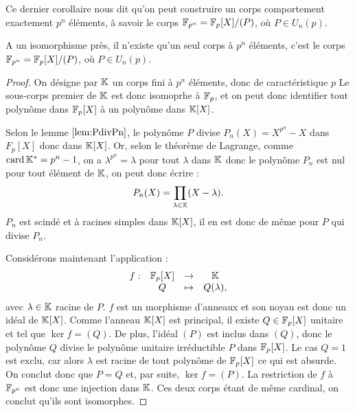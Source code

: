 \begin{rmq}
Ce dernier corollaire nous dit qu'on peut construire un corps comportement exactement $p^n$ éléments,
à savoir le corps $\mathbb{F}_{p^n} = \mathbb{F}_p[X] / (P)$, où $P \in U_n(p)$.
\end{rmq}

\begin{thm}
A un isomorphisme près, il n'existe qu'un seul corps à $p^n$ éléments, c'est le corps $\mathbb{F}_{p^n} = \mathbb{F}_p[X] / (P)$,
où $P \in U_n(p)$.
\end{thm}

\begin{proof}
On désigne par $\mathbb{K}$ un corps fini à $p^n$ éléments, donc de caractéristique $p$
Le sous-corps premier de $\mathbb{K}$ est donc isomoprhe à $\mathbb{F}_p$,
et on peut donc identifier tout polynôme dans $\mathbb{F}_p[X]$ à un polynôme dans $\mathbb{K}[X]$. \newline

Selon le lemme $\ref{lem:PdivPn}$, le polynôme $P$ divise $P_n(X) = X^{p^n} - X$ dans $F_p[X]$ donc dans $\mathbb{K}[X]$. 
Or, selon le théorème de Lagrange, comme $\operatorname{card}{\mathbb{K^{\ast}}} = p^n-1$, on a $\lambda^{p^n} = \lambda$ 
pour tout $\lambda$ dans $\mathbb{K}$ donc  le polynôme $P_n$ est nul pour tout élément de $\mathbb{K}$, on peut donc écrire :
\[ P_n(X) = \prod_{\lambda \in \mathbb{K}} (X - \lambda) . \]
$P_n$ est scindé et à racines simples dans $\mathbb{K}[X]$, il en est donc de même pour $P$ qui divise $P_n$. \newline

Considérons maintenant l'application :
\[ \begin{array}{c c c c}
f : & \mathbb{F}_p[X] & \to & \mathbb{K} \\
& Q & \mapsto & Q(\lambda) , 
\end{array} \]
avec $\lambda \in \mathbb{K}$ racine de $P$. $f$ est un morphisme d'anneaux et son noyau est donc un idéal de $\mathbb{K}[X]$.
Comme l'anneau $\mathbb{K}[X]$ est principal, il existe $Q \in \mathbb{F}_p[X]$ unitaire et tel que $\ker{f} = (Q)$.
De plus, l'idéal $(P)$ est inclus dans $(Q)$, donc le polynôme $Q$ divise le polynôme unitaire irréductible $P$ dans $\mathbb{F}_p[X]$.
Le cas $Q=1$ est exclu, car alors $\lambda$ est racine de tout polynôme de $\mathbb{F}_p[X]$ ce qui est absurde. 
On conclut donc que $P=Q$ et, par suite, $\ker{f} = (P)$. La restriction de $f$ à $\mathbb{F}_{p^n}$ est donc une injection dans $\mathbb{K}$.
Ces deux corps étant de même cardinal, on conclut qu'ils sont isomorphes.
\end{proof}


